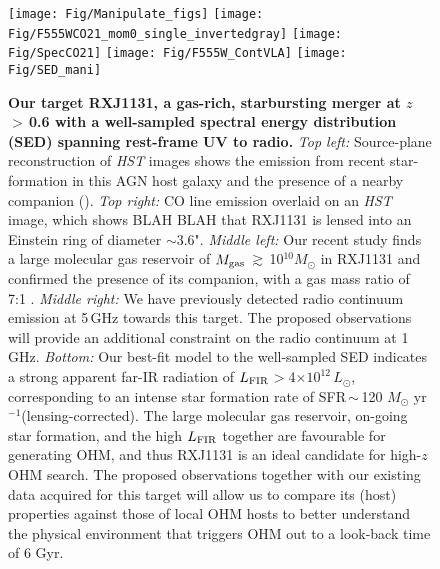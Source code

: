\documentclass[letterpaper,11pt]{article}
\newcommand{\Lsun}{\mbox{$L_{\odot}$}\xspace}
\newcommand{\Msun}{\mbox{$M_{\odot}$}\xspace}
\newcommand{\LFIR}{\mbox{$L_{\rm FIR}$}\xspace}
\newcommand{\pmOne}{\mbox{$^{-1}$}\xspace}
\newcommand{\E}[1]{\mbox{$\times10^{#1}$}}
\newcommand{\ssim}{\,$\sim$\,}
\newcommand{\obs}{observations\xspace}
\begin{document}
\begin{figure}[ptbh]
\texttt{[image: Fig/Manipulate\_figs]} 
\texttt{[image: Fig/F555WCO21\_mom0\_single\_invertedgray]}
\texttt{[image: Fig/SpecCO21]}
\texttt{[image: Fig/F555W\_ContVLA]}
\texttt{[image: Fig/SED\_mani]} \vspace{-0.25em}
\caption{
{\bf Our target RXJ1131, a gas-rich, starbursting merger at $z$\,$>$\,0.6 with a well-sampled spectral energy distribution (SED) spanning rest-frame UV to radio.} 
{\em Top left:} Source-plane reconstruction of {\it HST} images shows the
emission from recent star-formation in this AGN host galaxy and
the presence of a nearby companion (\citealt{Claeskens06a}).
{\em Top right:} 
CO line emission overlaid on an {\it HST} image, which shows BLAH BLAH
that RXJ1131 is lensed into an Einstein ring of diameter $\sim$3.6".
{\em Middle left:}
Our recent study finds a large molecular gas reservoir of $M_{\rm gas}$\,$\gtrsim$\,10$^{10}$\Msun in RXJ1131 and 
confirmed the presence of its companion, with a gas mass ratio of 7:1 \citep{Leung17a}. 
{\em Middle right:}
We have previously detected radio continuum emission at 5\,GHz towards this target.
The proposed \obs will provide an additional constraint on the radio continuum at 1\,GHz.
{\em Bottom:} Our best-fit model to the well-sampled SED 
indicates a strong apparent far-IR radiation of \LFIR$>$4\E{12}\,\Lsun, corresponding to
an intense star formation rate of SFR\ssim120 \Msun yr\pmOne (lensing-corrected).
The large molecular gas reservoir, on-going star formation, and the high \LFIR together
are favourable for generating OHM, and thus RXJ1131 is an
ideal candidate for high-$z$ OHM search.
The proposed \obs together with our existing data acquired for this target will allow us to 
compare its (host) properties against those of local OHM hosts to better understand 
the physical environment that triggers OHM out to a look-back time of 6 Gyr.
\label{fig:hst}}
\end{figure}
\end{document}

